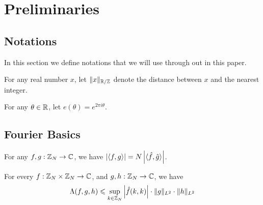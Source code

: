 \section{Preliminaries}
\subsection{Notations}
In this section we define notations that we will use through out in this paper. 

\noindent For any real number $ x $, let $ \| x \|_{{\mathbb R} /{\mathbb Z}} $ denote the distance between $ x $ and the nearest integer. 

\noindent For any $ \theta \in {\mathbb R}$, let $ e(\theta) = e^{2\pi i \theta}$.

\subsection{Fourier Basics}

\begin{lemma}
	For any $ f, g : {\mathbb Z}_N \rightarrow {\mathbb C} $, we have $ \left\vert{\langle f, g \rangle}\right\vert = N \left\vert{\langle \hat{f}, \hat{g} \rangle}\right\vert $.
\end{lemma}

\begin{lemma} \label{L2-ineq}
	For every $ f : {\mathbb Z}_N \times {\mathbb Z}_N \rightarrow {\mathbb C} $, and $ g, h : {\mathbb Z}_N \rightarrow {\mathbb C} $, we have
	$$ \Lambda(f,g,h) \leqslant \sup_{k \in {\mathbb Z}_N} \left\vert{\hat{f}(k,k)}\right\vert \cdot \|g \|_{L^2} \cdot \|h\|_{L^2} $$
\end{lemma}
